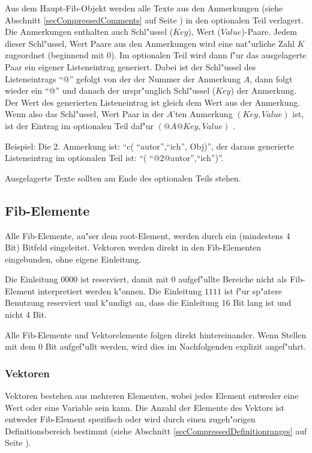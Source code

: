 \label{secCompressedOptionalPartComment}
Aus dem Haupt-Fib-Objekt werden alle Texte aus den Anmerkungen (siehe Abschnitt \ref{secCompressedComments} auf Seite \pageref{secCompressedComments} ) in den optionalen Teil verlagert. Die Anmerkungen enthalten auch Schl"ussel ($Key$), Wert ($Value$)-Paare. Jedem dieser Schl"ussel, Wert Paare aus den Anmerkungen wird eine nat"urliche Zahl $K$ zugeordnet (beginnend mit 0). Im optionalen Teil wird dann f"ur das ausgelagerte Paar ein eigener Listeneintrag generiert. Dabei ist der Schl"ussel des Listeneintrags ``@'' gefolgt von der der Nummer der Anmerkung $A$, dann folgt wieder ein ``@'' und danach der urspr"unglich Schl"ussel ($Key$) der Anmerkung. Der Wert des generierten Listeneintrag ist gleich dem Wert aus der Anmerkung.
Wenn also das Schl"ussel, Wert Paar in der $A$'ten Anmerkung $(Key, Value)$ ist, ist der Eintrag im optionalen Teil daf"ur $(@A@Key, Value)$ .

Beispiel: Die 2. Anmerkung ist: ``c( ``autor'',``ich'', Obj)'', der daraus generierte Listeneintrag im optionalen Teil ist: ``( ``@2@autor'',``ich'')''.

Ausgelagerte Texte sollten am Ende des optionalen Teils stehen.



\subsection{Fib-Elemente}
\label{secCompressedFibElement}

Alle Fib-Elemente, au"ser dem root-Element, werden durch ein (mindestens 4 Bit) Bitfeld eingeleitet. Vektoren werden direkt in den Fib-Elementen eingebunden, ohne eigene Einleitung.

Die Einleitung $0000$ ist reserviert, damit mit 0 aufgef"ullte Bereiche nicht als Fib-Element interpretiert werden k"onnen. Die Einleitung $1111$ ist f"ur sp"atere Benutzung reserviert und k"undigt an, dass die Einleitung 16 Bit lang ist und nicht 4 Bit.

Alle Fib-Elemente und Vektorelemente folgen direkt hintereinander. Wenn Stellen mit dem 0 Bit aufgef"ullt werden, wird dies im Nachfolgenden explizit angef"uhrt.


\subsubsection{Vektoren}
\label{secCompressedVector}

Vektoren bestehen aus mehreren Elementen, wobei jedes Element entweder eine Wert oder eine Variable sein kann. Die Anzahl der Elemente des Vektors ist entweder Fib-Element spezifisch oder wird durch einen zugeh"origen Definitionsbereich bestimmt (siehe Abschnitt \ref{secCompressedDefinitionranges} auf Seite \pageref{secCompressedDefinitionranges}). 

